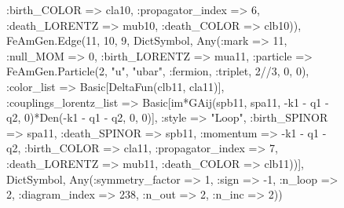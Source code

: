 \documentclass{revtex4}
\begin{document}
\begin{figure}[!htb]
\begin{center}
{:birth_COLOR => cla10, :propagator_index => 6, :death_LORENTZ => mub10, :death_COLOR => clb10)), FeAmGen.Edge(11, 10, 9, Dict{Symbol, Any}(:mark => 11, :null_MOM => 0, :birth_LORENTZ => mua11, :particle => FeAmGen.Particle(2, "u", "ubar", :fermion, :triplet, 2//3, 0, 0), :color_list => Basic[DeltaFun(clb11, cla11)], :couplings_lorentz_list => Basic[im*GAij(spb11, spa11, -k1 - q1 - q2, 0)*Den(-k1 - q1 - q2, 0, 0)], :style => "Loop", :birth_SPINOR => spa11, :death_SPINOR => spb11, :momentum => -k1 - q1 - q2, :birth_COLOR => cla11, :propagator_index => 7, :death_LORENTZ => mub11, :death_COLOR => clb11))], Dict{Symbol, Any}(:symmetry_factor => 1, :sign => -1, :n_loop => 2, :diagram_index => 238, :n_out => 2, :n_inc => 2)) 
}
\end{center}
\end{figure}
\end{document}
